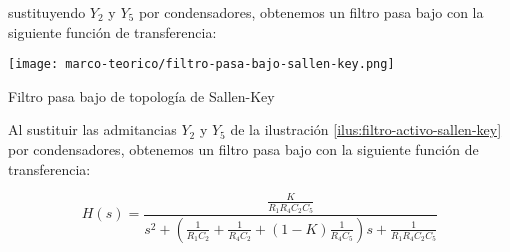 sustituyendo $Y_2$ y $Y_5$ por condensadores, obtenemos un filtro pasa bajo con la siguiente función de transferencia:


\begin{ilustracion}
    \centering
    \texttt{[image: marco-teorico/filtro-pasa-bajo-sallen-key.png]}
    \caption{Filtro pasa bajo de topología de Sallen-Key}
\end{ilustracion}

Al sustituir las admitancias $Y_2$ y $Y_5$ de la ilustración \ref{ilus:filtro-activo-sallen-key} por condensadores, obtenemos un filtro pasa bajo con la siguiente función de transferencia:

\begin{equation}
    H(s) = \frac{\frac{K}{R_1 R_4 C_2 C_5}}{s^2 + \left(\frac{1}{R_1 C_2} + \frac{1}{R_4 C_2} + \left(1 - K\right) \frac{1}{R_4 C_5}\right)s + \frac{1}{R_1 R_4 C_2 C_5}}
    \label{eq:transferencia-pasa-bajo-sallen-key}
\end{equation}